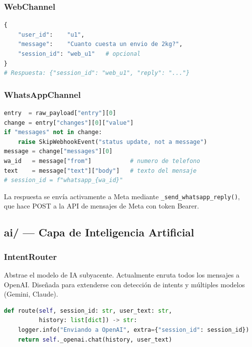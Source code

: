 \documentclass[12pt,a4paper]{article}
\begin{document}
\subsubsection*{WebChannel}

\begin{lstlisting}[language=Python, caption={Payload esperado por WebChannel}]
{
    "user_id":    "u1",
    "message":    "Cuanto cuesta un envio de 2kg?",
    "session_id": "web_u1"   # opcional
}
# Respuesta: {"session_id": "web_u1", "reply": "..."}
\end{lstlisting}

\subsubsection*{WhatsAppChannel}

\begin{lstlisting}[language=Python, caption={Extracción del payload de WhatsApp}]
entry  = raw_payload["entry"][0]
change = entry["changes"][0]["value"]
if "messages" not in change:
    raise SkipWebhookEvent("status update, not a message")
message = change["messages"][0]
wa_id   = message["from"]           # numero de telefono
text    = message["text"]["body"]   # texto del mensaje
# session_id = f"whatsapp_{wa_id}"
\end{lstlisting}

La respuesta se envía activamente a Meta mediante \texttt{\_send\_whatsapp\_reply()},
que hace POST a la API de mensajes de Meta con token Bearer.

\subsection{ai/ — Capa de Inteligencia Artificial}

\subsubsection*{IntentRouter}

Abstrae el modelo de IA subyacente. Actualmente enruta todos los mensajes a OpenAI.
Diseñada para extenderse con detección de intents y múltiples modelos (Gemini, Claude).

\begin{lstlisting}[language=Python, caption={IntentRouter.route()}]
def route(self, session_id: str, user_text: str,
          history: list[dict]) -> str:
    logger.info("Enviando a OpenAI", extra={"session_id": session_id})
    return self._openai.chat(history, user_text)
\end{lstlisting}
\end{document}
